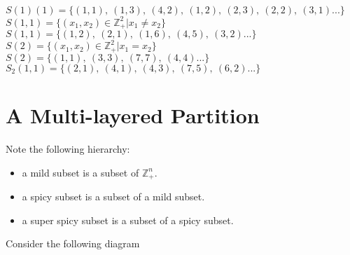 \documentclass[12pt]{article}
\begin{document}
\(S(1)(1)=\{(1,1),\ (1,3),\ (4,2),\ (1,2),\ (2,3),\ (2,2),\ (3,1)...\}\) \newline \newline
\(S(1,1)=\{(x_1,x_2)\in \mathbb{Z}_+^2 | x_1 \neq x_2\}\) \newline
\(S(1,1)=\{(1,2),\ (2,1),\ (1,6),\ (4,5),\ (3,2)...\}\) \newline
\newline
\(S(2)=\{(x_1,x_2)\in \mathbb{Z}_+^2 | x_1 = x_2\}\) \newline
\(S(2)=\{(1,1),\ (3,3),\ (7,7),\ (4,4)...\}\) \newline
\newline
\(S_2(1,1)=\{(2,1),\ (4,1),\ (4,3),\ (7,5),\ (6,2)...\}\) \newline
\section{A Multi-layered Partition}
Note the following hierarchy:
\begin{itemize}
	\item a mild subset is a subset of \(\mathbb{Z}_+^n\).
	\item a spicy subset is a subset of a mild subset.
	\item a super spicy subset is a subset of a spicy subset.
\end{itemize}
Consider the following diagram
\end{document}
